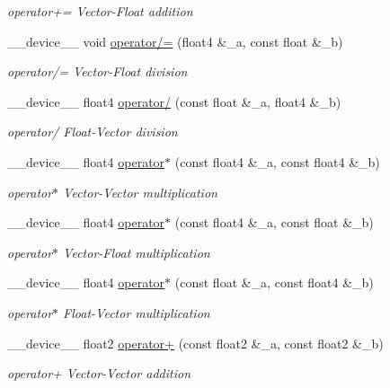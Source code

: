 \begin{DoxyCompactItemize}
\begin{DoxyCompactList}\small\item\em operator+= Vector-\/\-Float addition \end{DoxyCompactList}\item 
\-\_\-\-\_\-device\-\_\-\-\_\- void \hyperlink{MathHelpers_8cuh_aa0079d65f459311e3a405303341117a6}{operator/=} (float4 \&\-\_\-a, const float \&\-\_\-b)
\begin{DoxyCompactList}\small\item\em operator/= Vector-\/\-Float division \end{DoxyCompactList}\item 
\-\_\-\-\_\-device\-\_\-\-\_\- float4 \hyperlink{MathHelpers_8cuh_afb9acd59ace59f5399422dfc0961e8e8}{operator/} (const float \&\-\_\-a, float4 \&\-\_\-b)
\begin{DoxyCompactList}\small\item\em operator/ Float-\/\-Vector division \end{DoxyCompactList}\item 
\-\_\-\-\_\-device\-\_\-\-\_\- float4 \hyperlink{MathHelpers_8cuh_ac85bdc63747d2660f8239b6ffb07ac68}{operator$\ast$} (const float4 \&\-\_\-a, const float4 \&\-\_\-b)
\begin{DoxyCompactList}\small\item\em operator$\ast$ Vector-\/\-Vector multiplication \end{DoxyCompactList}\item 
\-\_\-\-\_\-device\-\_\-\-\_\- float4 \hyperlink{MathHelpers_8cuh_a7fb5ca8f0fa9f285c63371ec6b96f44e}{operator$\ast$} (const float4 \&\-\_\-a, const float \&\-\_\-b)
\begin{DoxyCompactList}\small\item\em operator$\ast$ Vector-\/\-Float multiplication \end{DoxyCompactList}\item 
\-\_\-\-\_\-device\-\_\-\-\_\- float4 \hyperlink{MathHelpers_8cuh_a8e5e570ecc2fd4b44ea25472f0f995d2}{operator$\ast$} (const float \&\-\_\-a, const float4 \&\-\_\-b)
\begin{DoxyCompactList}\small\item\em operator$\ast$ Float-\/\-Vector multiplication \end{DoxyCompactList}\item 
\-\_\-\-\_\-device\-\_\-\-\_\- float2 \hyperlink{MathHelpers_8cuh_a48abcf7bba893357551375e9438d6f3b}{operator+} (const float2 \&\-\_\-a, const float2 \&\-\_\-b)
\begin{DoxyCompactList}\small\item\em operator+ Vector-\/\-Vector addition \end{DoxyCompactList}\item 

\end{DoxyCompactItemize}
